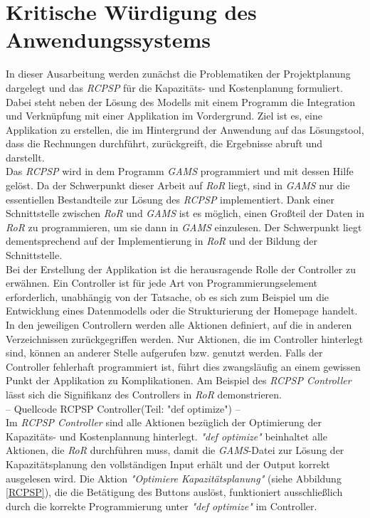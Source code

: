 \documentclass[a4paper,12pt,parskip,bibtotoc,liststotoc]{article}
\begin{document}
\section{Kritische Würdigung des Anwendungssystems} \label{krit}
In dieser Ausarbeitung werden zunächst die Problematiken der Projektplanung dargelegt und das \textit{RCPSP} für die Kapazitäts- und Kostenplanung formuliert. Dabei steht neben der Lösung des Modells mit einem Programm die Integration und Verknüpfung mit einer Applikation im Vordergrund. Ziel ist es, eine Applikation zu erstellen, die im Hintergrund der Anwendung auf das Lösungstool, dass die Rechnungen durchführt, zurückgreift, die Ergebnisse abruft und darstellt.\\
Das \textit{RCPSP} wird in dem Programm \textit{GAMS} programmiert und mit dessen Hilfe gelöst. Da der Schwerpunkt dieser Arbeit auf \textit{RoR} liegt, sind in \textit{GAMS} nur die essentiellen Bestandteile zur Lösung des \textit{RCPSP} implementiert. Dank einer Schnittstelle zwischen \textit{RoR} und \textit{GAMS} ist es möglich, einen Großteil der Daten in \textit{RoR} zu programmieren, um sie dann in \textit{GAMS} einzulesen. Der Schwerpunkt liegt dementsprechend auf der Implementierung in \textit{RoR} und der Bildung der Schnittstelle.\\
Bei der Erstellung der Applikation ist die herausragende Rolle der Controller zu erwähnen. Ein Controller ist für jede Art von Programmierungselement erforderlich, unabhängig von der Tatsache, ob es sich zum Beispiel um die Entwicklung eines Datenmodells oder die Strukturierung der Homepage handelt. In den jeweiligen Controllern werden alle Aktionen definiert, auf die in anderen Verzeichnissen zurückgegriffen werden. Nur Aktionen, die im Controller hinterlegt sind, können an anderer Stelle aufgerufen bzw. genutzt werden. Falls der Controller fehlerhaft programmiert ist, führt dies zwangsläufig an einem gewissen Punkt der Applikation zu Komplikationen. Am Beispiel des \textit{RCPSP Controller} lässt sich die Signifikanz des Controllers in \textit{RoR} demonstrieren.\\
-- Quellcode RCPSP Controller(Teil: "def optimize") --\\
Im \textit{RCPSP Controller} sind alle Aktionen bezüglich der Optimierung der Kapazitäts- und Kostenplannung hinterlegt. \textit{"def optimize"} beinhaltet alle Aktionen, die \textit{RoR} durchführen muss, damit die \textit{GAMS}-Datei zur Lösung der Kapazitätsplanung den vollständigen Input erhält und der Output korrekt ausgelesen wird. Die Aktion \textit{"Optimiere Kapazitätsplanung"} (siehe Abbildung \ref{RCPSP}), die die Betätigung des Buttons auslöst, funktioniert ausschließlich durch die korrekte Programmierung unter \textit{"def optimize"} im Controller.\\
\end{document}
